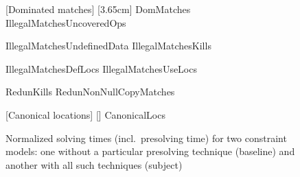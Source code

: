 \begin{figure}
  \centering

                      [Dominated matches]%
                      [3.65cm]%
                      {DomMatches}%
  \hfill%
                      {IllegalMatchesUncoveredOps}

  \vspace{\betweensubfigures}

                      {IllegalMatchesUndefinedData}%
  \hfill%
                      {IllegalMatchesKills}%

  \vspace{\betweensubfigures}

                      {IllegalMatchesDefLocs}%
  \hfill%
                      {IllegalMatchesUseLocs}

  \vspace{\betweensubfigures}

                      {RedunKills}%
  \hfill%
                      {RedunNonNullCopyMatches}

  \vspace{\betweensubfigures}

                      [Canonical locations]%
                      [\linewidth]%
                      {CanonicalLocs}

  \caption[%
            Set of plots for evaluating each presolving technique's impact on
            solving time%
          ]%
          {%
            Normalized solving times (incl.\ presolving time) for two
            constraint models: one without a particular presolving technique
            (baseline) and another with all such techniques (subject)%
          }
\end{figure}

